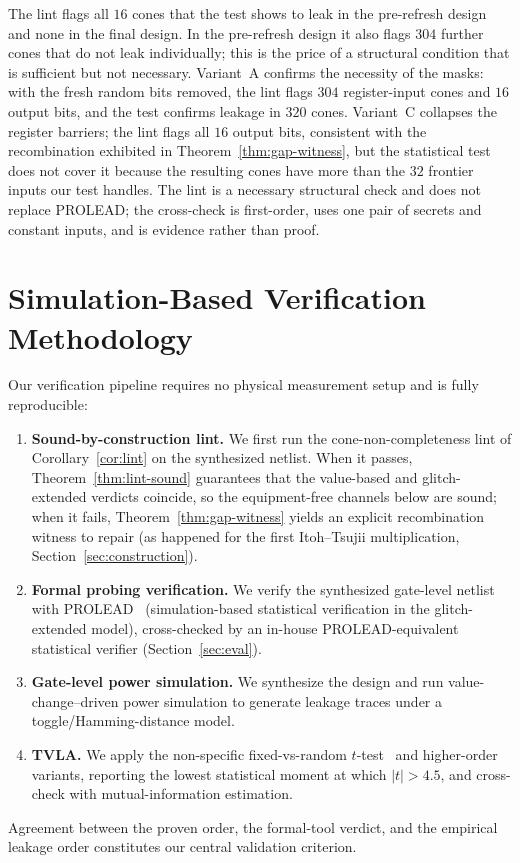 \documentclass[lettersize,journal]{IEEEtran}
\begin{document}
The lint flags all $16$ cones that the test shows to leak in the pre-refresh
design and none in the final design. In the pre-refresh design it also flags
$304$ further cones that do not leak individually; this is the price of a
structural condition that is sufficient but not necessary. Variant~A confirms the necessity of the
masks: with the fresh random bits removed, the lint flags $304$ register-input
cones and $16$ output bits, and the test confirms leakage in $320$ cones.
Variant~C collapses the register barriers; the lint flags all $16$ output bits,
consistent with the recombination exhibited in
Theorem~\ref{thm:gap-witness}, but the statistical test does not cover it
because the resulting cones have more than the $32$ frontier inputs our test
handles. The lint is a necessary structural check and does not replace
PROLEAD; the cross-check is first-order, uses one pair of secrets and constant
inputs, and is evidence rather than proof.

\section{Simulation-Based Verification Methodology}
\label{sec:method}
Our verification pipeline requires no physical measurement setup and is fully
reproducible:
\begin{enumerate}
  \item \textbf{Sound-by-construction lint.} We first run the
        cone-non-completeness lint of Corollary~\ref{cor:lint} on the
        synthesized netlist. When it passes, Theorem~\ref{thm:lint-sound}
        guarantees that the value-based and glitch-extended verdicts
        coincide, so the equipment-free channels below are sound; when it
        fails, Theorem~\ref{thm:gap-witness} yields an explicit
        recombination witness to repair (as happened for the first
        Itoh--Tsujii multiplication, Section~\ref{sec:construction}).
  \item \textbf{Formal probing verification.} We verify the synthesized
        gate-level netlist with PROLEAD~\cite{muller2022prolead}
        (simulation-based statistical verification in the glitch-extended
        model), cross-checked by an in-house PROLEAD-equivalent
        statistical verifier (Section~\ref{sec:eval}).
  \item \textbf{Gate-level power simulation.} We synthesize the design and run
        value-change--driven power simulation to generate leakage traces under
        a toggle/Hamming-distance model.
  \item \textbf{TVLA.} We apply the non-specific fixed-vs-random
        $t$-test~\cite{goodwill2011tvla} and higher-order variants, reporting
        the lowest statistical moment at which $|t|>4.5$, and cross-check with
        mutual-information estimation.
\end{enumerate}
Agreement between the proven order, the formal-tool verdict, and the empirical
leakage order constitutes our central validation criterion.
\end{document}
